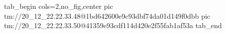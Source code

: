  
 
 
 
 

\qqSecOrig


\ifcmt
  tab_begin cols=2,no_fig,center
    pic tm://20_12_22.22.33.48@1bd642600e9c93dbf74da01d149f0dbb
    pic tm://20_12_22.22.33.50@41359e93cdf114d420e2f55fab1af53a
  tab_end
\fi

